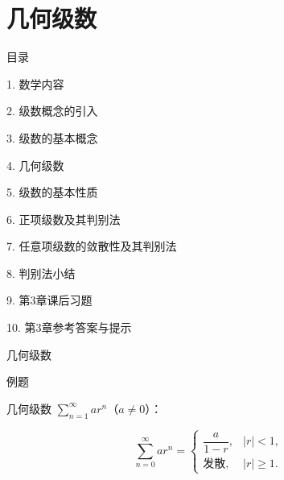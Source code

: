 \documentclass[aspectratio=169,10pt,fontset=fandol]{ctexbeamer}
\begin{document}
\section{几何级数}
\begin{frame}[t,fragile]{目录}
\normalsize
{\color{black}\normalsize 1. 数学内容\par}\vspace{0.3em}
{\color{black}\normalsize 2. 级数概念的引入\par}\vspace{0.3em}
{\color{black}\normalsize 3. 级数的基本概念\par}\vspace{0.3em}
{\color{blue}\normalsize 4. 几何级数\par}\vspace{0.3em}
{\color{gray!40}\normalsize 5. 级数的基本性质\par}\vspace{0.3em}
{\color{gray!40}\normalsize 6. 正项级数及其判别法\par}\vspace{0.3em}
{\color{gray!40}\normalsize 7. 任意项级数的敛散性及其判别法\par}\vspace{0.3em}
{\color{gray!40}\normalsize 8. 判别法小结\par}\vspace{0.3em}
{\color{gray!40}\normalsize 9. 第3章课后习题\par}\vspace{0.3em}
{\color{gray!40}\normalsize 10. 第3章参考答案与提示\par}\vspace{0.3em}
\end{frame}
\begin{frame}[t,fragile]{几何级数}
\normalsize
\begin{block}{例题}
{\normalsize


几何级数 \(\sum\limits_{n = 1}^{  \infty } ar^n\)（\(a \neq 0\)）：

\[

\sum_{n=0}^{\infty} ar^n = 

\begin{cases}

\dfrac{a}{1-r}, & |r| < 1,\\[6pt]

\text{发散}, & |r| \geq 1.

\end{cases}

\]


}
\end{block}
\end{frame}
\end{document}
